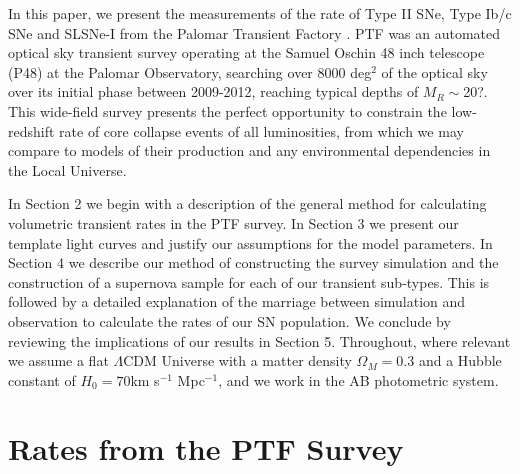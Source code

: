 \documentclass[a4paper,fleqn,usenatbib]{mnras}
\newcommand{\angus}[1]{\color{JungleGreen}#1\color{black}}
\begin{document}
In this paper, we present the measurements of the rate of Type II SNe, Type Ib/c SNe and SLSNe-I from the Palomar Transient Factory \citep[PTF;][]{PTF_REF}. PTF was an automated optical sky transient survey operating at the Samuel Oschin 48 inch telescope (P48) at the Palomar Observatory, searching over 8000 deg$^{2}$ of the optical sky over its initial phase between 2009-2012, reaching typical depths of $M_{R}\sim$\angus{20?}. This wide-field survey presents the perfect opportunity to constrain the low-redshift rate of core collapse events of all luminosities, from which we may compare to models of their production and any environmental dependencies in the Local Universe. 

In Section 2 we begin with a description of the general method for calculating volumetric transient rates in the PTF survey. In Section 3 we present our template light curves and justify our assumptions for the model parameters. In Section 4 we describe our method of constructing the survey simulation and the construction of a supernova sample for each of our transient sub-types. This is followed by a detailed explanation of the marriage between simulation and observation to calculate the rates of our SN population. We conclude by reviewing the implications of our results in Section 5. Throughout, where relevant we assume a flat $\Lambda$CDM Universe with a matter density $\Omega_{M}=0.3$ and a Hubble constant of $H_{0}= 70$km s$^{-1}$ Mpc$^{-1}$, and we work in the AB photometric system.


\section{Rates from the PTF Survey}
\label{sec:ratesPTF}
\end{document}

